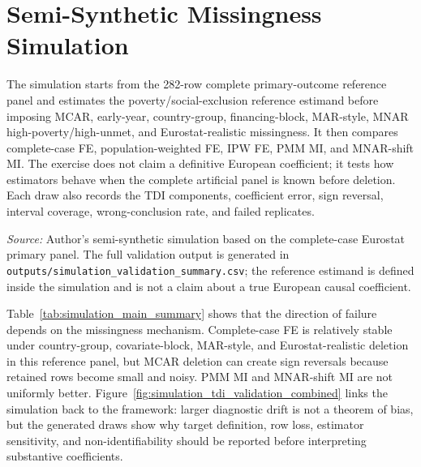 \FloatBarrier

\section{Semi-Synthetic Missingness Simulation}

The simulation starts from the 282-row complete primary-outcome reference panel and estimates the poverty/social-exclusion reference estimand before imposing MCAR, early-year, country-group, financing-block, MAR-style, MNAR high-poverty/high-unmet, and Eurostat-realistic missingness. It then compares complete-case FE, population-weighted FE, IPW FE, PMM MI, and MNAR-shift MI. The exercise does not claim a definitive European coefficient; it tests how estimators behave when the complete artificial panel is known before deletion. Each draw also records the TDI components, coefficient error, sign reversal, interval coverage, wrong-conclusion rate, and failed replicates.

\begin{table}[H]
\centering
\scriptsize
\caption{Semi-synthetic missingness simulation summary. The reference estimand is the poverty/social-exclusion coefficient from the complete 282-row primary panel. Each mechanism uses 100 replicates; the table reports selected estimators to show bias, sign reversal, interval coverage of the reference estimand, and wrong-conclusion rates.}
\label{tab:simulation_main_summary}

\vspace{0.25em}

\begin{minipage}{0.96\textwidth}
\scriptsize \textit{Source:} Author's semi-synthetic simulation based on the complete-case Eurostat primary panel. The full validation output is generated in \texttt{outputs/simulation\_validation\_summary.csv}; the reference estimand is defined inside the simulation and is not a claim about a true European causal coefficient.
\end{minipage}
\end{table}

Table~\ref{tab:simulation_main_summary} shows that the direction of failure depends on the missingness mechanism. Complete-case FE is relatively stable under country-group, covariate-block, MAR-style, and Eurostat-realistic deletion in this reference panel, but MCAR deletion can create sign reversals because retained rows become small and noisy. PMM MI and MNAR-shift MI are not uniformly better. Figure~\ref{fig:simulation_tdi_validation_combined} links the simulation back to the framework: larger diagnostic drift is not a theorem of bias, but the generated draws show why target definition, row loss, estimator sensitivity, and non-identifiability should be reported before interpreting substantive coefficients.

